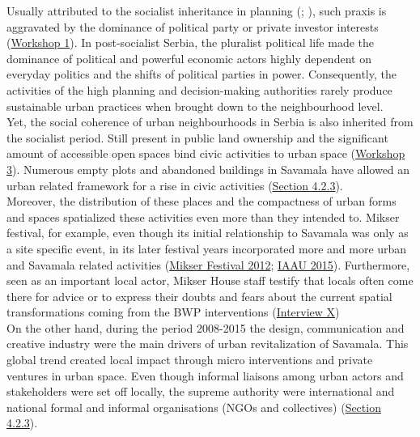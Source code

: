 \documentclass[11pt]{report}
\begin{document}
{{{{Usually attributed to the socialist inheritance in planning (\href{Vujosevic}{\citealt{vujosevic_novi_2012}}; \href{vujosevic}{\citealt{vujosevic_regionalizam_2015}}),
such praxis is aggravated by the dominance of political party or private investor interests
(\href{Expert Workshop}{Workshop 1}).
In post-socialist Serbia, the pluralist political life made the dominance of political and powerful economic actors highly dependent on everyday politics and the shifts of political parties in power. Consequently, the activities of the high planning and decision-making authorities rarely produce sustainable urban practices when brought down to the neighbourhood level.
\\

Yet, the social coherence of urban neighbourhoods in Serbia is also inherited from the socialist period. Still present in public land ownership and the significant amount of accessible open spaces bind civic activities to urban space 
(\href{Student Workshop}{Workshop 3}).
Numerous empty plots and abandoned buildings in Savamala have allowed an urban related framework for a rise in civic activities (\href{Section 4.2.3}{Section 4.2.3}).
\\

Moreover, the distribution of these places and the compactness of urban forms and spaces spatialized these activities even more than they intended to.
Mikser festival, for example, even though its initial relationship to Savamala was only as a site specific event, in its later festival years incorporated more and more urban and Savamala related activities
(\href{Mikser}{Mikser Festival 2012}; \href{IAAU}{IAAU 2015}).
Furthermore, seen as an important local actor, Mikser House staff testify that locals often come there for advice or to express their doubts and fears about the current spatial transformations coming from the BWP interventions 
(\href{InterviewX}{Interview X})
\\

On the other hand, during the period 2008-2015 the design, communication and creative industry were the main drivers of urban revitalization of Savamala.
This global trend created local impact through micro interventions and private ventures in urban space.
Even though informal liaisons among urban actors and stakeholders were set off locally, the supreme  authority were international and national formal and informal organisations (NGOs and collectives) (\href{Section 4.2.3}{Section 4.2.3}). %
\\

}}}}
\end{document}
